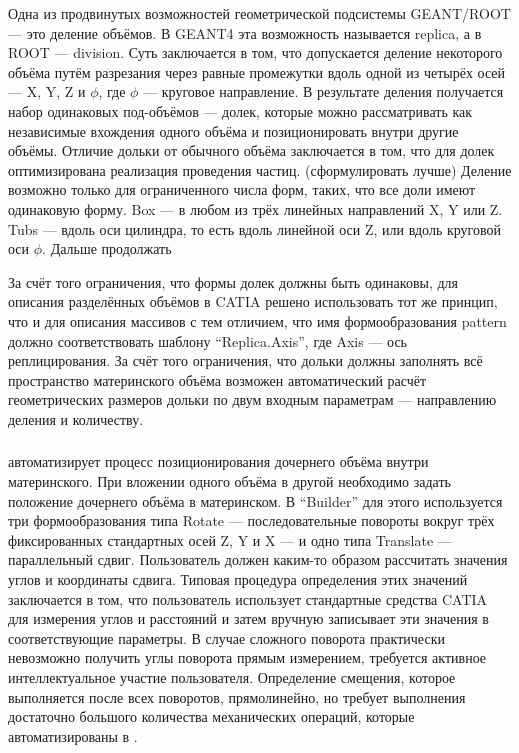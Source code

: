 Одна из продвинутых возможностей геометрической подсистемы GEANT/ROOT --- это деление объёмов. В GEANT4 эта возможность называется replica, а в ROOT --- division. Суть заключается в том, что допускается деление некоторого объёма путём разрезания через равные промежутки вдоль одной из четырёх осей --- X, Y, Z и $\phi$, где $\phi$ --- круговое направление. В результате деления получается набор одинаковых под-объёмов --- долек, которые можно рассматривать как независимые вхождения одного объёма и позиционировать внутри другие объёмы. Отличие дольки от обычного объёма заключается в том, что для долек оптимизирована реализация проведения частиц. (\todo сформулировать лучше) Деление возможно только для ограниченного числа форм, таких, что все доли имеют одинаковую форму. Box --- в любом из трёх линейных направлений X, Y или Z. Tubs --- вдоль оси цилиндра, то есть вдоль линейной оси Z, или вдоль круговой оси $\phi$. Дальше продолжать\todo 

За счёт того ограничения, что формы долек должны быть одинаковы, для описания разделённых объёмов в CATIA решено использовать тот же принцип, что и для описания массивов с тем отличием, что имя формообразования pattern должно соответствовать шаблону ``Replica.Axis'', где Axis --- ось реплицирования. За счёт того ограничения, что дольки должны заполнять всё пространство материнского объёма возможен автоматический расчёт геометрических размеров дольки по двум входным параметрам --- направлению деления и количеству.

\subsubsection{}\label{sec:PointToPointAligner}

 автоматизирует процесс позиционирования дочернего объёма внутри материнского. При вложении одного объёма в другой необходимо задать положение дочернего объёма в материнском. В ``Builder'' для этого используется три формообразования типа Rotate --- последовательные повороты вокруг трёх фиксированных стандартных осей Z, Y и X --- и одно типа Translate --- параллельный сдвиг. Пользователь должен каким-то образом рассчитать значения углов и координаты сдвига. Типовая процедура определения этих значений заключается в том, что пользователь использует стандартные средства CATIA для измерения углов и расстояний и затем вручную записывает эти значения в соответствующие параметры. В случае сложного поворота практически невозможно получить углы поворота прямым измерением, требуется активное интеллектуальное участие пользователя. Определение смещения, которое выполняется после всех поворотов, прямолинейно, но требует выполнения достаточно большого количества механических операций, которые автоматизированы в .

